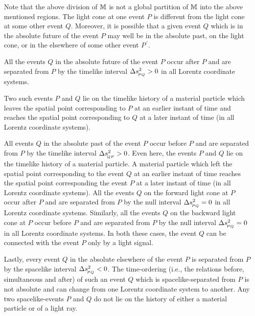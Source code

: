 Note that the above  division of $\mathbb{M}$ is not a global 
partition of $\mathbb{M}$ into the above mentioned regions. The 
light cone at one event $P$ is different  from the light 
cone at some other event $Q$. Moreover, it is possible that 
a given event $Q$ which is in the absolute future of the 
event $P$ may well be in the absolute past, on the light 
cone,  or in the elsewhere of some other event $P^{\,'}$.

All the events $Q$ {in the absolute future} of the event $P$ 
occur {after} $P$  and are separated from $P$ by the 
{timelike interval} $\Delta s_{_{\hspace*{-1.5pt}{PQ}}}^2>0$ in all Lorentz 
coordinate systems. 

Two such events $P$ and $Q$ lie on the 
timelike history of a material particle which leaves the 
spatial point corresponding to $P$  at an earlier instant of 
time and reaches the spatial point corresponding to $Q$ at a 
later instant of time (in all Lorentz coordinate systems).

All events $Q$ {in the absolute past} of the event $P$ occur 
{before} $P$ and are separated from $P$ by the {timelike 
interval} $\Delta s_{_{\hspace*{-1.5pt}{QP}}}^2>0$. Even here, the events $P$ 
and $Q$ lie on the timelike history of a material particle. 
A material particle which left the spatial point 
corresponding to the event $Q$ at an {earlier} instant of 
time reaches the spatial point  corresponding 
the event $P$  at a later instant of time (in all Lorentz 
coordinate systems).  All the events $Q$ {on the forward 
light cone} at $P$ 
occur {after} $P$  and are separated from $P$ by the null 
interval $\Delta s_{_{\hspace*{-1.5pt}{PQ}}}^2=0$ in all Lorentz coordinate 
systems. Similarly, all the events $Q$ {on the backward 
light cone} at $P$ occur {before} $P$  and are separated 
from $P$ by the {null interval} $\Delta s_{_{\hspace*{-1.5pt}{PQ}}}^2=0$ in 
all Lorentz coordinate systems. In both these cases, the 
event $Q$ can be connected with the event $P$ only by a 
light signal.

Lastly, every  event $Q$ {in the absolute elsewhere} of the 
event $P$ is separated from $P$ by the {spacelike 
interval}  $\Delta s_{_{\hspace*{-1.5pt}{PQ}}}^2<0$. The {time-ordering} 
(i.e., the relations before, simultaneous and after) of such 
an event $Q$ which is  spacelike-separated from $P$ {is not 
absolute} and can  change from one Lorentz coordinate system 
to another. Any two spacelike-events $P$ and $Q$ do not lie 
on the  history of either a material particle or of a light 
ray.

\vspace{-.2cm}

